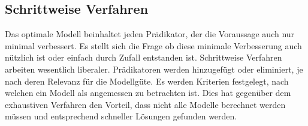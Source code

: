 \subsection{Schrittweise Verfahren} 
Das optimale Modell beinhaltet jeden Prädikator, der die Voraussage auch nur minimal verbessert. 
Es stellt sich die Frage ob diese minimale Verbesserung auch nützlich ist oder einfach durch Zufall entstanden ist. 
Schrittweise Verfahren arbeiten wesentlich liberaler.  Prädikatoren werden hinzugefügt oder eliminiert, je nach deren Relevanz für die Modellgüte. 
Es werden Kriterien festgelegt, nach welchen ein Modell als angemessen zu betrachten ist. 
Dies hat gegenüber dem exhaustiven Verfahren den Vorteil, dass nicht alle Modelle berechnet werden müssen und entsprechend schneller Lösungen gefunden werden. 

